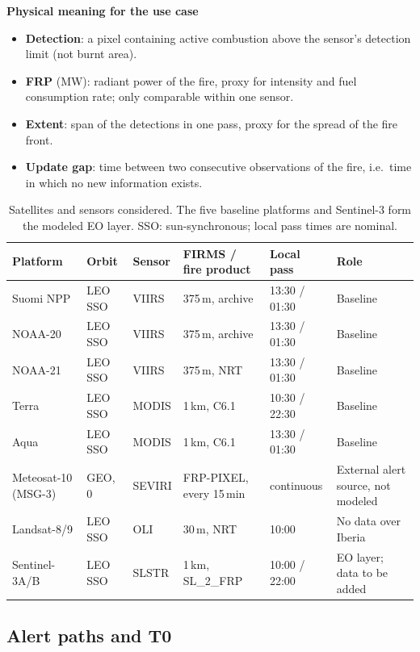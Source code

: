 \documentclass[11pt]{article}
\begin{document}
\textbf{Physical meaning for the use case}
\begin{itemize}
  \item \textbf{Detection}: a pixel containing active combustion above the sensor's detection limit (not burnt area).
  \item \textbf{FRP} (MW): radiant power of the fire, proxy for intensity and fuel consumption rate; only comparable within one sensor.
  \item \textbf{Extent}: span of the detections in one pass, proxy for the spread of the fire front.
  \item \textbf{Update gap}: time between two consecutive observations of the fire, i.e.\ time in which no new information exists.
\end{itemize}

\begin{table}[!t]
\centering
\begin{tabular}{p{2.6cm} p{1.4cm} p{1.3cm} p{2.6cm} p{2.4cm} p{3.1cm}}
\hline
Platform & Orbit & Sensor & FIRMS / fire product & Local pass & Role \\
\hline
Suomi NPP & LEO SSO & VIIRS & 375\,m, archive & 13:30 / 01:30 & Baseline \\
NOAA-20 & LEO SSO & VIIRS & 375\,m, archive & 13:30 / 01:30 & Baseline \\
NOAA-21 & LEO SSO & VIIRS & 375\,m, NRT & 13:30 / 01:30 & Baseline \\
Terra & LEO SSO & MODIS & 1\,km, C6.1 & 10:30 / 22:30 & Baseline \\
Aqua & LEO SSO & MODIS & 1\,km, C6.1 & 13:30 / 01:30 & Baseline \\
Meteosat-10 (MSG-3) & GEO, 0\textdegree{} & SEVIRI & FRP-PIXEL, every 15\,min & continuous & External alert source, not modeled \\
Landsat-8/9 & LEO SSO & OLI & 30\,m, NRT & 10:00 & No data over Iberia \\
Sentinel-3A/B & LEO SSO & SLSTR & 1\,km, SL\_2\_FRP & 10:00 / 22:00 & EO layer; data to be added \\
\hline
\end{tabular}
\caption{Satellites and sensors considered. The five baseline platforms and Sentinel-3 form the modeled EO layer. SSO: sun-synchronous; local pass times are nominal.}
\label{tab:sensing_layer}
\end{table}

\subsection{Alert paths and T0}
\label{subsec:alert_paths}
\end{document}
